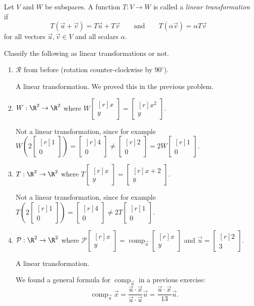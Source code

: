 \documentclass{problemset}
\DeclareMathOperator{\Comp}{comp}
\newcommand{\mat}[1]{\begin{bmatrix*}[r]#1\end{bmatrix*}}
\begin{document}
	\begin{definition}
		Let $V$ and $W$ be subspaces. A function $T:V\to W$ is called a \emph{linear transformation}
		if 
		\[
			T(\vec u+\vec v)=T\vec u+T\vec v \qquad\text{and}\qquad
			T(\alpha \vec v)=\alpha T\vec v
		\]
		for all vectors $\vec u,\vec v\in V$ and all scalars $\alpha$.
	\end{definition}

	\question
	\begin{parts}
		\item Classify the following as linear transformations or not.
			\begin{enumerate}
				\item $\mathcal R$ from before (rotation counter-clockwise by $90^\circ$).
					\begin{solution}
						A linear transformation. We proved this in the previous problem.
					\end{solution}
				\item $W:\R^2\to\R^2$ where $W\mat{x\\y}=\mat{x^2\\y}$.
					\begin{solution}
						Not a linear transformation, since for example 
						$W\left(2\mat{1\\0}\right)=\mat{4\\0}\neq\mat{2\\0}=2W\mat{1\\0}$. 
					\end{solution}
				\item $T:\R^2\to\R^2$ where $T\mat{x\\y}=\mat{x+2\\y}$.
					\begin{solution}
						Not a linear transformation, since for example
						$T\left(2\mat{1\\0}\right) = \mat{4\\0} \neq 2T\mat{1\\0}$. 
					\end{solution}
				\item $\mathcal P:\R^2\to\R^2$ where 
					$\mathcal P\mat{x\\y}=\Comp_{\vec u}\mat{x\\y}$ and 
					$\vec u=\mat{2\\3}$.
					\begin{solution}
						A linear transformation.

						We found a general formula for $\Comp_{\vec u}$ in a previous
						exercise:
						\[
							\Comp_{\vec u}\vec x
							=\frac{\vec u\cdot\vec x}{\vec u\cdot\vec u}\vec u
							=\frac{\vec u\cdot\vec x}{13}\vec u.
						\]


\end{solution}
\end{enumerate}
\end{parts}
\end{document}
